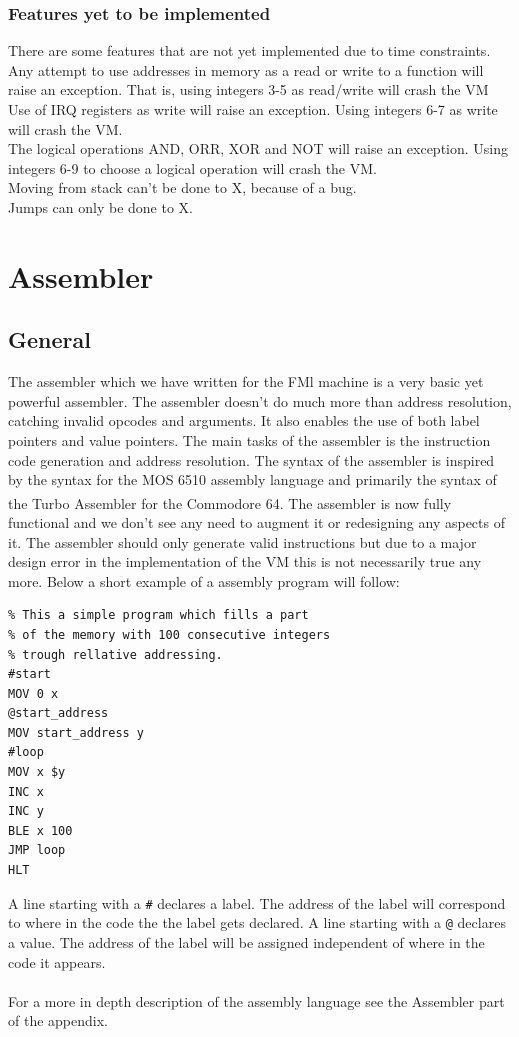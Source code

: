 \documentclass{article}
\newcommand{\V}{\verb}
\begin{document}
\subsubsection{Features yet to be implemented}
There are some features that are not yet implemented due to time constraints.
\\
Any attempt to use addresses in memory as a read or write to a function will raise an exception. That is, using integers 3-5 as read/write will crash the VM
\\
Use of IRQ registers as write will raise an exception. Using integers 6-7 as write will crash the VM.
\\
The logical operations AND, ORR, XOR and NOT will raise an exception. Using integers 6-9 to choose a logical operation will crash the VM.
\\
Moving from stack can't be done to X, because of a bug.
\\
Jumps can only be done to X.
\section{Assembler}
\subsection{General}
The assembler which we have written for the FMl machine is a very basic yet
powerful assembler. The assembler doesn't do much more than address
resolution, catching invalid opcodes and arguments. It also enables the use of
both label pointers and value pointers. The main tasks of the assembler is the instruction code generation and
address resolution. The syntax of the assembler is inspired by the syntax for
the MOS 6510 assembly language and primarily the syntax of the Turbo
Assembler\textsuperscript{\cite{tasm}} for the Commodore
64\textsuperscript{\cite{c64}}. The assembler is now fully functional and  we
don't see any need to augment it or redesigning any aspects of it. The assembler should only generate valid instructions but due to a major design error in the
implementation of the VM this is not necessarily true any more. Below a short
example of a assembly program will follow:
\begin{verbatim}
% This a simple program which fills a part
% of the memory with 100 consecutive integers
% trough rellative addressing.
#start
MOV 0 x
@start_address
MOV start_address y
#loop
MOV x $y
INC x
INC y
BLE x 100
JMP loop
HLT
\end{verbatim}
A line starting with a \V+#+ declares a label. The address of the label will
correspond to where in the code the the label gets declared.
A line starting with a \V+@+ declares a value. The address of the label will be
assigned independent of where in the code it appears.
\\
\\
For a more in depth description of the assembly language see the Assembler
part of the appendix.
\end{document}
